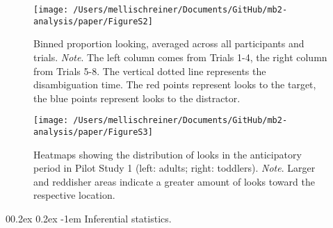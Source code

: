 \documentclass[
  man, donotrepeattitle,floatsintext]{apa6}
\makeatletter
\let\oldparagraph\paragraph
\renewcommand{\paragraph}{
    \@ifstar
      \xxxParagraphStar
      \xxxParagraphNoStar
  }
\newcommand{\xxxParagraphStar}[1]{\oldparagraph*{#1}\mbox{}}
\newcommand{\xxxParagraphNoStar}[1]{\oldparagraph{#1}\mbox{}}
\renewcommand{\paragraph}{\@startsection{paragraph}{4}{\parindent}%
  {0\baselineskip \@plus 0.2ex \@minus 0.2ex}%
  {-1em}%
  {\normalfont\normalsize\bfseries\itshape\typesectitle}}
\makeatother
\begin{document}
\begin{figure}

\texttt{[image: /Users/mellischreiner/Documents/GitHub/mb2-analysis/paper/FigureS2]} \hfill{}

\caption{Binned proportion looking, averaged across all participants and trials. \newline{} \textit{Note}. The left column comes from Trials 1-4, the right column from Trials 5-8. The vertical dotted line represents the disambiguation time. The red points represent looks to the target, the blue points represent looks to the distractor.}\label{fig:figS2}
\end{figure}

\begin{figure}

\texttt{[image: /Users/mellischreiner/Documents/GitHub/mb2-analysis/paper/FigureS3]} \hfill{}

\caption{Heatmaps showing the distribution of looks in the anticipatory period in Pilot Study 1 (left: adults; right: toddlers). \newline{} \textit{Note}. Larger and reddisher areas indicate a greater amount of looks toward the respective location.}\label{fig:figS3}
\end{figure}

\paragraph{Inferential statistics.}\label{inferential-statistics.}
\end{document}

